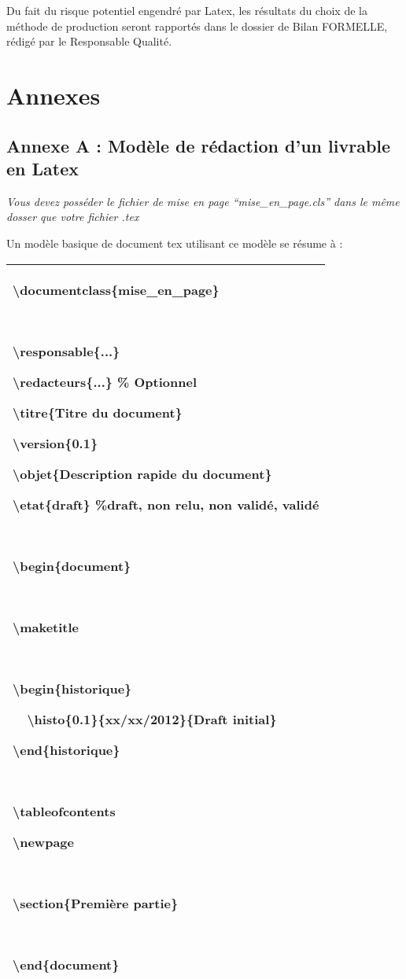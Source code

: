 \documentclass{mise_en_page}
\begin{document}
Du fait du risque potentiel engendré par Latex, les résultats du choix
de la méthode de production seront rapportés dans le dossier de Bilan
FORMELLE, rédigé par le Responsable Qualité.

\section{Annexes}
\subsection{Annexe A : Modèle de rédaction d’un livrable en Latex}
\emph{Vous devez posséder le fichier de mise en page “mise\_en\_page.cls” dans le
même dosser que votre fichier .tex}

Un modèle basique de document tex utilisant ce modèle se résume à :

\begin{flushleft}
\tablehead{}
\begin{supertabular}{|m{16.345cm}|}
\hline
{\textbackslash}documentclass\{mise\_en\_page\}

~

{\textbackslash}responsable\{...\}

{\textbackslash}redacteurs\{...\} \% Optionnel

{\textbackslash}titre\{Titre du document\}

{\textbackslash}version\{0.1\}

{\textbackslash}objet\{Description rapide du document\}

{\textbackslash}etat\{draft\} \%draft, non relu, non validé, validé

~

{\textbackslash}begin\{document\}

~

{\textbackslash}maketitle

~

{\textbackslash}begin\{historique\}

\ \ {\textbackslash}histo\{0.1\}\{xx/xx/2012\}\{Draft initial\}

{\textbackslash}end\{historique\}

~

{\textbackslash}tableofcontents

{\textbackslash}newpage

~

{\textbackslash}section\{Première partie\}

~

{\textbackslash}end\{document\}\\\hline
\end{supertabular}
\end{flushleft}
\end{document}
